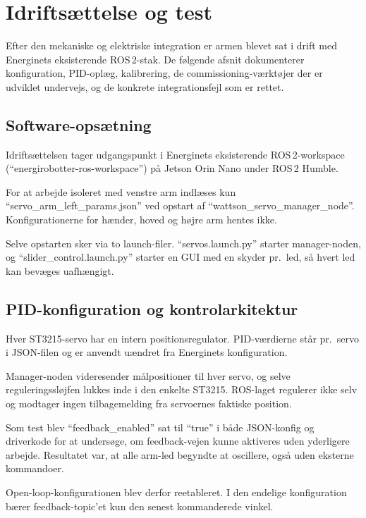 \chapter{Idriftsættelse og test}
\label{ch:idrift}

Efter den mekaniske og elektriske integration er armen blevet sat i
drift med Energinets eksisterende ROS\,2-stak. De følgende afsnit
dokumenterer konfiguration, PID-oplæg, kalibrering, de
commissioning-værktøjer der er udviklet undervejs, og de konkrete
integrationsfejl som er rettet.

\section{Software-opsætning}

Idriftsættelsen tager udgangspunkt i Energinets eksisterende
ROS\,2-workspace (\enquote{energirobotter-ros-workspace}) på Jetson
Orin Nano under ROS\,2 Humble.

For at arbejde isoleret med venstre arm indlæses kun
\enquote{servo\_arm\_left\_params.json} ved opstart af
\enquote{wattson\_servo\_manager\_node}. Konfigurationerne for hænder,
hoved og højre arm hentes ikke.

Selve opstarten sker via to launch-filer. \enquote{servos.launch.py}
starter manager-noden, og \enquote{slider\_control.launch.py} starter
en GUI med en skyder pr.~led, så hvert led kan bevæges uafhængigt.

\section{PID-konfiguration og kontrolarkitektur}

Hver ST3215-servo har en intern positionsregulator. PID-værdierne
står pr.~servo i JSON-filen og er anvendt uændret fra Energinets
konfiguration.

Manager-noden videresender målpositioner til hver servo, og selve
reguleringssløjfen lukkes inde i den enkelte ST3215. ROS-laget
regulerer ikke selv og modtager ingen tilbagemelding fra servoernes
faktiske position.

Som test blev \enquote{feedback\_enabled} sat til \enquote{true} i
både JSON-konfig og driverkode for at undersøge, om feedback-vejen
kunne aktiveres uden yderligere arbejde. Resultatet var, at alle
arm-led begyndte at oscillere, også uden eksterne kommandoer.

Open-loop-konfigurationen blev derfor reetableret. I den endelige
konfiguration bærer feedback-topic'et kun den senest kommanderede
vinkel.

